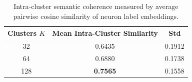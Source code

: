 \begin{table}[h]
\centering
\caption{Intra-cluster semantic coherence measured by average pairwise cosine similarity of neuron label embeddings.}
\label{tab:coherence}
\begin{tabular}{ccc}
\toprule
Clusters $K$ & Mean Intra-Cluster Similarity & Std \\
\midrule
  32 & 0.6435 & 0.1912 \\
  64 & 0.6880 & 0.1738 \\
  128 & \textbf{0.7565} & 0.1558 \\
\bottomrule
\end{tabular}
\end{table}